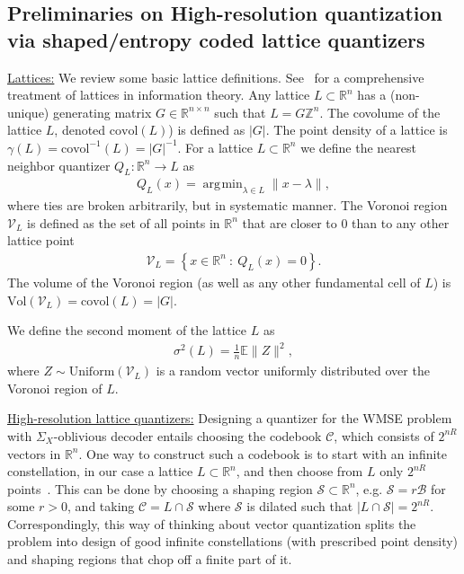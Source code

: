 \documentclass[journal]{IEEEtran}
\newcommand{\ZZ}{\mathbb{Z}}
\newcommand{\RR}{\mathbb{R}}
\newcommand{\Unif}{\mathrm{Uniform}}
\def\EE{\mathbb{E}}
\newcommand{\m}{\mathcal}
\newcommand{\covol}{\mathrm{covol}}
\DeclareMathOperator*{\argmin}{\arg\!\min}
\begin{document}
\subsection{Preliminaries on High-resolution quantization via shaped/entropy coded lattice quantizers} 
\label{subsec:latticequantHR}

\underline{Lattices:} We review some basic lattice definitions. See~\cite{ramiBook} for a comprehensive treatment of lattices in information theory. Any lattice $L\subset \RR^n$ has a (non-unique) generating matrix $G\in\RR^{n\times n}$ such that $L=G\ZZ^n$. The covolume of the lattice $L$, denoted $\mathrm{covol}(L)$) is defined as $| G|$. The point density of a lattice is $\gamma(L)=\covol^{-1}(L)=|G|^{-1}$. For a lattice $L\subset\RR^n$ we define the nearest neighbor quantizer $Q_L:\RR^n\to L$ as
\begin{align}
Q_{L}(x)=\argmin_{\lambda\in L}\|x-\lambda\|, 
\end{align}
where ties are broken arbitrarily, but in systematic manner. The Voronoi region $\m{V}_L$ is defined as the set of all points in $\RR^n$ that are closer to $0$ than to any other lattice point
\begin{align}
\m{V}_L=\left\{x\in\RR^n~:~Q_L(x)=0\right\}.    
\end{align}
The volume of the Voronoi region (as well as any other fundamental cell of $L$) is $\mathrm{Vol}(\m{V}_L)=\covol(L)=|G|$.

We define the second moment of the lattice $L$ as
\begin{align}
\sigma^2(L)=\frac{1}{n}\EE\|Z\|^2,    
\end{align}
where $Z\sim\Unif(\m{V}_L)$ is a random vector uniformly distributed over the Voronoi region of $L$. 

\medskip

\underline{High-resolution lattice quantizers:} Designing a quantizer for the WMSE problem with $\Sigma_X$-oblivious decoder entails choosing the
codebook $\m{C}$, which consists of $2^{nR}$ vectors in $\RR^n$. One way to construct such a
codebook is to start with an infinite constellation, in our case a lattice $L\subset\RR^n$, and
then choose from $L$ only $2^{nR}$ points~\cite{ramiBook}. This can be done by choosing a shaping
region $\m{S}\subset\RR^n$, e.g. $\m{S}=r\m{B}$ for some $r>0$, and taking $\m{C}=L\cap\m{S}$
where $\m{S}$ is dilated such that $|L\cap \m{S}|=2^{nR}$. Correspondingly, this way of thinking
about vector quantization splits the problem into design of good infinite constellations (with
prescribed point density) and shaping regions that chop off a finite part of it.
\end{document}
